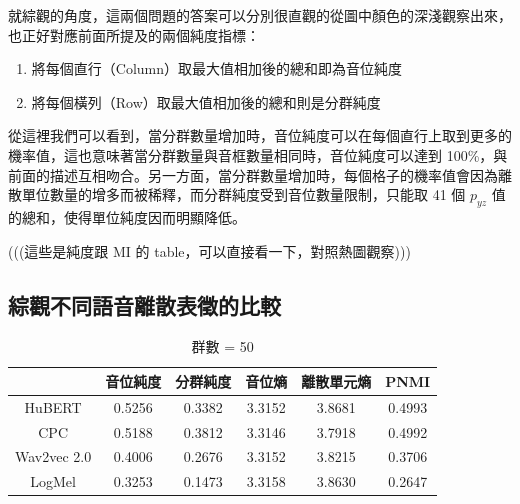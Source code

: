 {{

        就綜觀的角度，這兩個問題的答案可以分別很直觀的從圖中顏色的深淺觀察出來，也正好對應前面所提及的兩個純度指標：
        \begin{enumerate}
            \item 將每個直行（Column）取最大值相加後的總和即為音位純度
            \item 將每個橫列（Row）取最大值相加後的總和則是分群純度
        \end{enumerate}

        從這裡我們可以看到，當分群數量增加時，音位純度可以在每個直行上取到更多的機率值，這也意味著當分群數量與音框數量相同時，音位純度可以達到 100\%，與前面的描述互相吻合。另一方面，當分群數量增加時，每個格子的機率值會因為離散單位數量的增多而被稀釋，而分群純度受到音位數量限制，只能取 41 個 $p_{yz}$ 值的總和，使得單位純度因而明顯降低。

}





(((這些是純度跟 MI 的 table，可以直接看一下，對照熱圖觀察)))


\subsection{綜觀不同語音離散表徵的比較}

{


\begin{table}[!htbp]
    \centering
    \begin{subtable}[t]{\textwidth}
        \centering
        \begin{tabular}{|c|c|c|c|c|c|} \hline
                        & 音位純度   & 分群純度   & 音位熵    & 離散單元熵  & PNMI   \\ \hline
            HuBERT      &     0.5256 &     0.3382 &    3.3152 &      3.8681 & 0.4993 \\ \hline    %
            CPC         &     0.5188 &     0.3812 &    3.3146 &      3.7918 & 0.4992 \\ \hline    %
            Wav2vec 2.0 &     0.4006 &     0.2676 &    3.3152 &      3.8215 & 0.3706 \\ \hline    %
            LogMel      &     0.3253 &     0.1473 &    3.3158 &      3.8630 & 0.2647 \\ \hline    %
        \end{tabular}
        \caption{群數 = 50}
        \label{tab:ch3-clu050-phn}
    \end{subtable}


\end{table}}}
